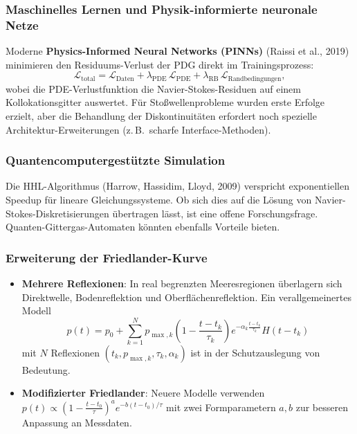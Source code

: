 ﻿\documentclass[12pt,a4paper]{article}
\theoremstyle{definition}
\theoremstyle{remark}
\begin{document}
\subsubsection{Maschinelles Lernen und Physik-informierte neuronale Netze}

Moderne \textbf{Physics-Informed Neural Networks (PINNs)} (Raissi et al., 2019) minimieren den Residuums-Verlust der PDG direkt im Trainingsprozess:
\begin{equation}
\mathcal{L}_{\text{total}} = \mathcal{L}_{\text{Daten}} + \lambda_{\text{PDE}}\,\mathcal{L}_{\text{PDE}} + \lambda_{\text{RB}}\,\mathcal{L}_{\text{Randbedingungen}},
\end{equation}
wobei die PDE-Verlustfunktion die Navier-Stokes-Residuen auf einem Kollokationsgitter auswertet. Für Stoßwellenprobleme wurden erste Erfolge erzielt, aber die Behandlung der Diskontinuitäten erfordert noch spezielle Architektur-Erweiterungen (z.\,B.\ scharfe Interface-Methoden).

\subsubsection{Quantencomputergestützte Simulation}

Die HHL-Algorithmus (Harrow, Hassidim, Lloyd, 2009) verspricht exponentiellen Speedup für lineare Gleichungssysteme. Ob sich dies auf die Lösung von Navier-Stokes-Diskreti\-sierungen übertragen lässt, ist eine offene Forschungsfrage. Quanten-Gittergas-Automaten könnten ebenfalls Vorteile bieten.

\subsubsection{Erweiterung der Friedlander-Kurve}

\begin{itemize}
\item \textbf{Mehrere Reflexionen}: In real begrenzten Meeresregionen überlagern sich Direktwelle, Bodenreflektion und Oberflächenreflektion. Ein verallgemeinertes Modell
\begin{equation}
p(t) = p_0 + \sum_{k=1}^N p_{\max,k}\left(1 - \frac{t-t_k}{\tau_k}\right)e^{-\alpha_k\frac{t-t_k}{\tau_k}} H(t-t_k)
\end{equation}
mit $N$ Reflexionen $(t_k, p_{\max,k}, \tau_k, \alpha_k)$ ist in der Schutzauslegung von Bedeutung.
\item \textbf{Modifizierter Friedlander}: Neuere Modelle verwenden $p(t) \propto \left(1 - \frac{t-t_0}{\tau}\right)^a e^{-b(t-t_0)/\tau}$ mit zwei Formparametern $a, b$ zur besseren Anpassung an Messdaten.
\end{itemize}
\end{document}
